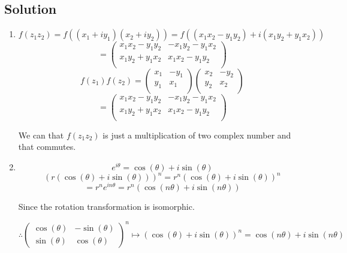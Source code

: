 \documentclass[12pt]{article}
\begin{document}
\subsection{Solution}

\begin{enumerate}
    \item
          \[
              f\left(z_{1} z_{2}\right) = f((x_1 + iy_1)(x_2 + iy_2)) = f((x_1x_2 - y_1y_2) + i(x_1y_2 + y_1x_2))
          \]
          \[
              =\begin{pmatrix}
                  x_1x_2 - y_1y_2 & -x_1y_2 - y_1x_2 \\
                  x_1y_2 + y_1x_2 & x_1x_2 - y_1y_2  \\
              \end{pmatrix}
          \]
          \[
              f\left(z_{1}\right) f\left(z_{2}\right) = \begin{pmatrix}
                  x_1 & -y_1 \\
                  y_1 & x_1  \\
              \end{pmatrix}\begin{pmatrix}
                  x_2 & -y_2 \\
                  y_2 & x_2  \\
              \end{pmatrix}
          \]
          \[
              = \begin{pmatrix}
                  x_1x_2 - y_1y_2 & -x_1y_2 - y_1x_2 \\
                  x_1y_2 + y_1x_2 & x_1x_2 - y_1y_2  \\
              \end{pmatrix}
          \]

          We can that \(f\left(z_{1} z_{2}\right)\) is just a multiplication of two complex number and that commutes.
    \item \[
              e^{i\theta} = \cos(\theta) + i\sin(\theta)
          \]
          \begin{equation}
              {(r(\cos (\theta)+i \sin (\theta)))}^{n}=r^{n}{(\cos (\theta) + i \sin (\theta))}^n
          \end{equation}
          \[
              =r^{n}e^{in\theta} =  r^{n}(\cos(n\theta) + i\sin(n\theta))
          \]

          Since the rotation transformation is isomorphic.

          \[
              \therefore \left(\begin{array}{cc}
                  \cos (\theta) & -\sin (\theta) \\
                  \sin (\theta) & \cos (\theta)
              \end{array}\right)^{n} \mapsto {(\cos(\theta) + i\sin(\theta))}^n = \cos(n\theta) + i\sin(n\theta)
          \]


\end{enumerate}
\end{document}
